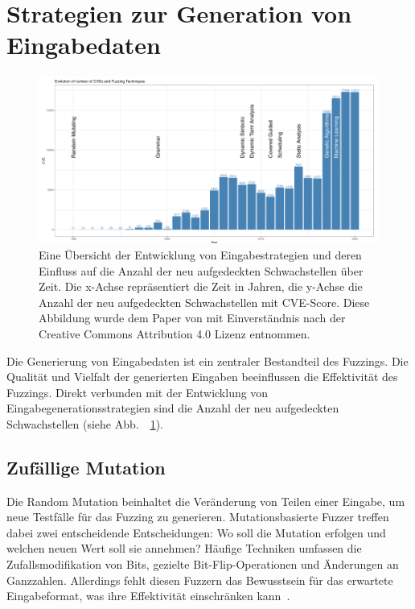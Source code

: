 \section{Strategien zur Generation von Eingabedaten}\label{sec:strategien-von-fuzzern-zur-eingabegenerierung}
\begin{figure}[ht]
    \centering
    \includegraphics[width=\textwidth]{res/entwicklung_der_eingabestrategien}
    \caption{Eine Übersicht der Entwicklung von Eingabestrategien und deren Einfluss auf die Anzahl der neu aufgedeckten Schwachstellen
    über Zeit.
    Die x-Achse repräsentiert die Zeit in Jahren, die y-Achse die Anzahl der neu aufgedeckten Schwachstellen mit CVE-Score.
    Diese Abbildung wurde dem Paper von \citet{eceiza_fuzzing_2021} mit Einverständnis nach der Creative Commons Attribution 4.0 Lizenz entnommen.}
    \label{fig:eingabestrategien}
\end{figure}
Die Generierung von Eingabedaten ist ein zentraler Bestandteil des Fuzzings.
Die Qualität und Vielfalt der generierten Eingaben beeinflussen die Effektivität des Fuzzings.
Direkt verbunden mit der Entwicklung von Eingabegenerationsstrategien sind die Anzahl der neu aufgedeckten Schwachstellen (siehe Abb.\ ~\ref{fig:eingabestrategien}).
\subsection{Zufällige Mutation}\label{subsec:zufallige-mutation}
Die Random Mutation beinhaltet die Veränderung von Teilen einer Eingabe, um neue Testfälle für das
Fuzzing zu generieren.
Mutationsbasierte Fuzzer treffen dabei zwei entscheidende Entscheidungen: Wo soll die Mutation erfolgen und welchen neuen
Wert soll sie annehmen?
Häufige Techniken umfassen die Zufallsmodifikation von Bits, gezielte Bit-Flip-Operationen und Änderungen an Ganzzahlen.
Allerdings fehlt diesen Fuzzern das Bewusstsein für das erwartete Eingabeformat, was ihre Effektivität einschränken kann~\cite{saavedra_review_2019}.

